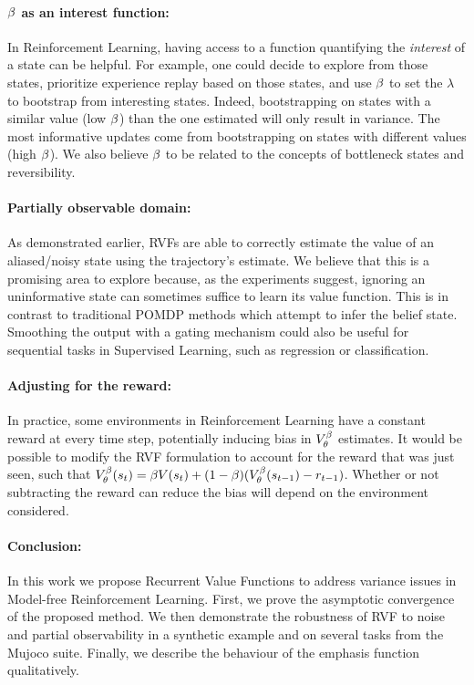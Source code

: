\paragraph{$\beta$ as an interest function:}  In Reinforcement Learning, having access to a function quantifying the \emph{interest} \cite{mahmood2015emphatic} of a state can be helpful. For example, one could decide to explore from those states, prioritize experience replay based on those states, and use $\beta$ to set the $\lambda$ to bootstrap from interesting states. Indeed, bootstrapping on states with a similar value (low $\beta$) than the one estimated will only result in variance. The most informative updates come from bootstrapping on states with different values (high $\beta$). We also believe $\beta$ to be related to the concepts of bottleneck states \cite{tishby2011information} and reversibility.
\paragraph{Partially observable domain: } As demonstrated earlier, RVFs are able to correctly estimate the value of an aliased/noisy state using the trajectory's estimate. We believe that this is a promising area to explore because, as the experiments suggest, ignoring an uninformative state can sometimes suffice to learn its value function. This is in contrast to traditional POMDP methods which attempt to infer the belief state. Smoothing the output with a gating mechanism could also be useful for sequential tasks in Supervised Learning, such as regression or classification. 
\paragraph{Adjusting for the reward:} In practice, some environments in Reinforcement Learning have
a constant reward at every time step, potentially inducing bias in $V^{\beta}_{\theta}$ estimates. It would be possible to modify the RVF formulation to account for the reward that was just seen, such that $V^{\beta}_{\theta}(s_t) = \beta V(s_t) + (1-\beta) (V^{\beta}_{\theta}(s_{t-1}) - r_{t-1})$.
Whether or not subtracting the reward can reduce the bias will depend on the environment considered.
\paragraph{Conclusion:} In this work we propose Recurrent Value Functions to address variance issues in Model-free Reinforcement Learning. First, we prove the asymptotic convergence of the proposed method. We then demonstrate the robustness of RVF to noise and partial observability in a synthetic example and on several tasks from the Mujoco suite. Finally, we describe the behaviour of the emphasis function qualitatively.

